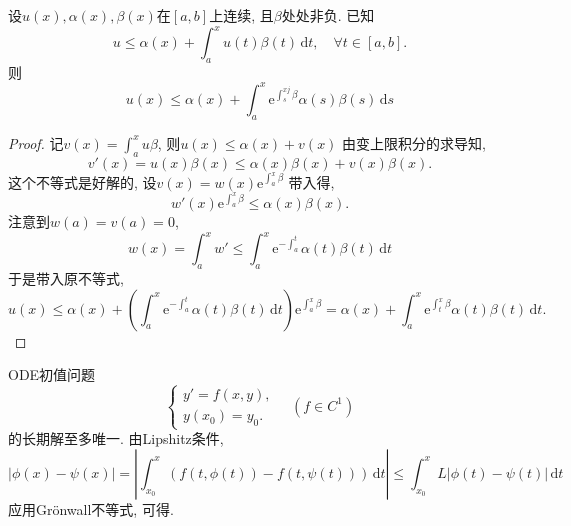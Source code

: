 
\begin{theorem}[Gr\"onwall不等式]
  设$u(x),\alpha(x),\beta(x)$在$[a,b]$上连续, 且$\beta$处处非负.
  已知
  \begin{equation}
    u \le \alpha(x) + \int_{a}^{x} u(t)\beta(t) \, \mathrm{d}t ,\quad \forall t \in [a,b].
  \end{equation}
  则
  \begin{equation}
    u(x) \le \alpha(x) + \int_{a}^{x} \mathrm{e}^{\int _{s}^{xj
    }\beta} \alpha(s) \beta(s)  \, \mathrm{d}s 
  \end{equation}
\end{theorem}
\begin{proof}
  记$v(x) = \int _{a}^{x} u \beta$, 则$u(x) \le \alpha(x) + v(x)$
  由变上限积分的求导知,
  \begin{equation}
    v'(x) = u(x)\beta(x) \le \alpha(x) \beta(x) + v(x) \beta(x).
  \end{equation}
  这个不等式是好解的, 设$v(x) = w(x)\mathrm{e}^{\int _{a}^{x}\beta}$
  带入得,
  \begin{equation}
    w'(x)\mathrm{e}^{\int _{a}^{x}\beta} \le \alpha(x) \beta(x).
  \end{equation}
  注意到$w(a) = v(a) = 0$,
  \begin{equation}
    w(x) = \int _{a}^{x} w' \le \int _{a}^{x} \mathrm{e}^{-\int _{a}^{t}} \alpha(t) \beta(t)\, \mathrm{d} t
  \end{equation}
  于是带入原不等式,
  \begin{equation}
    u(x) \le \alpha(x) + \left( \int _{a}^{x} \mathrm{e}^{-\int _{a}^{t}}\alpha(t) \beta(t) \, \mathrm{d} t \right) \mathrm{e}^{\int _{a}^{x} \beta} = \alpha(x) + \int _{a}^{x} \mathrm{e}^{\int _{t}^{x}\beta} \alpha(t) \beta(t) \, \mathrm{d} t.
  \end{equation}
\end{proof}

\begin{example}
  ODE初值问题
  \begin{equation}
    \begin{cases}
      y' = f(x,y), \\
      y(x_0) = y_0.
    \end{cases}
    \quad (f \in C^{1})
  \end{equation}
  的长期解至多唯一.
  由Lipshitz条件,
  \begin{equation}
    \left| \phi (x) - \psi (x) \right| = \left| \int _{x_0}^{x} \left( f(t,\phi (t) ) - f(t,\psi (t)) \right)\, \mathrm{d} t \right| \le \int _{x_0}^{x} L\left| \phi (t) - \psi (t) \right| \, \mathrm{d} t
  \end{equation}
  应用Gr\"onwall不等式, 可得.
\end{example}

